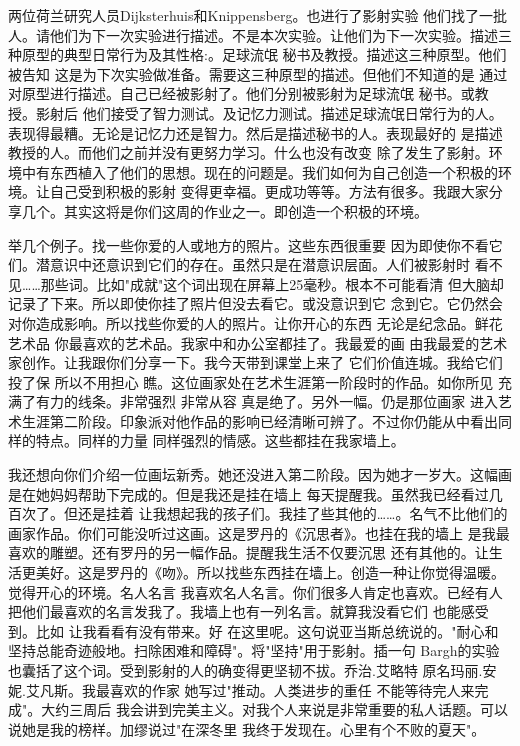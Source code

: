 两位荷兰研究人员Dijksterhuis和Knippensberg。也进行了影射实验 他们找了一批人。请他们为下一次实验进行描述。不是本次实验。让他们为下一次实验。描述三种原型的典型日常行为及其性格:。足球流氓 秘书及教授。描述这三种原型。他们被告知 这是为下次实验做准备。需要这三种原型的描述。但他们不知道的是 通过对原型进行描述。自己已经被影射了。他们分别被影射为足球流氓 秘书。或教授。影射后 他们接受了智力测试。及记忆力测试。描述足球流氓日常行为的人。表现得最糟。无论是记忆力还是智力。然后是描述秘书的人。表现最好的 是描述教授的人。而他们之前并没有更努力学习。什么也没有改变 除了发生了影射。环境中有东西植入了他们的思想。现在的问题是。我们如何为自己创造一个积极的环境。让自己受到积极的影射 变得更幸福。更成功等等。方法有很多。我跟大家分享几个。其实这将是你们这周的作业之一。即创造一个积极的环境。 

举几个例子。找一些你爱的人或地方的照片。这些东西很重要 因为即使你不看它们。潜意识中还意识到它们的存在。虽然只是在潜意识层面。人们被影射时 看不见……那些词。比如"成就"这个词出现在屏幕上25毫秒。根本不可能看清 但大脑却记录了下来。所以即使你挂了照片但没去看它。或没意识到它 念到它。它仍然会对你造成影响。所以找些你爱的人的照片。让你开心的东西 无论是纪念品。鲜花 艺术品 你最喜欢的艺术品。我家中和办公室都挂了。我最爱的画 由我最爱的艺术家创作。让我跟你们分享一下。我今天带到课堂上来了 它们价值连城。我给它们投了保 所以不用担心 瞧。这位画家处在艺术生涯第一阶段时的作品。如你所见 充满了有力的线条。非常强烈 非常从容 真是绝了。另外一幅。仍是那位画家 进入艺术生涯第二阶段。印象派对他作品的影响已经清晰可辨了。不过你仍能从中看出同样的特点。同样的力量 同样强烈的情感。这些都挂在我家墙上。 

我还想向你们介绍一位画坛新秀。她还没进入第二阶段。因为她才一岁大。这幅画是在她妈妈帮助下完成的。但是我还是挂在墙上 每天提醒我。虽然我已经看过几百次了。但还是挂着 让我想起我的孩子们。我挂了些其他的……。名气不比他们的画家作品。你们可能没听过这画。这是罗丹的《沉思者》。也挂在我的墙上 是我最喜欢的雕塑。还有罗丹的另一幅作品。提醒我生活不仅要沉思 还有其他的。让生活更美好。这是罗丹的《吻》。所以找些东西挂在墙上。创造一种让你觉得温暖。觉得开心的环境。名人名言 我喜欢名人名言。你们很多人肯定也喜欢。已经有人把他们最喜欢的名言发我了。我墙上也有一列名言。就算我没看它们 也能感受到。比如 让我看看有没有带来。好 在这里呢。这句说亚当斯总统说的。"耐心和坚持总能奇迹般地。扫除困难和障碍"。将"坚持"用于影射。插一句 Bargh的实验也囊括了这个词。受到影射的人的确变得更坚韧不拔。乔治.艾略特 原名玛丽.安妮.艾凡斯。我最喜欢的作家 她写过"推动。人类进步的重任 不能等待完人来完成"。大约三周后 我会讲到完美主义。对我个人来说是非常重要的私人话题。可以说她是我的榜样。加缪说过"在深冬里 我终于发现在。心里有个不败的夏天"。 

